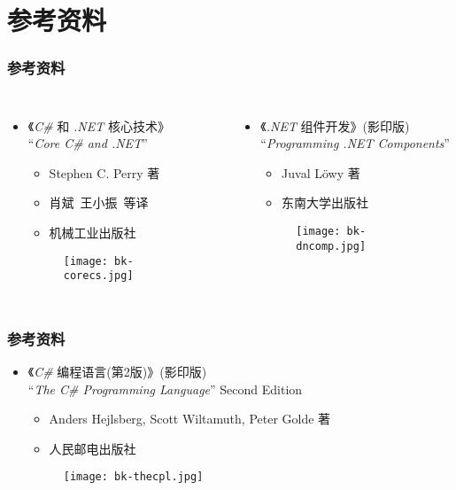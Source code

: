 \section{参考资料}
\begin{frame}[t]
\frametitle{参考资料}

\begin{columns}
  \begin{itemize}
  \item 《\textit{C\#} 和 \textit{.NET} 核心技术》\\
    ``\textit{Core C\# and .NET}''
    \begin{itemize}
    \item Stephen C. Perry 著
    \item 肖斌\ 王小振\ 等译
    \item 机械工业出版社
    \end{itemize}
    \begin{figure}
      \centering
\texttt{[image: bk-corecs.jpg]}
    \end{figure}
  \end{itemize}

  \begin{itemize}
  \item 《\textit{.NET} 组件开发》(影印版)\\
 ``\textit{Programming .NET Components}''
    \begin{itemize}
    \item Juval L\"owy 著
    \item 东南大学出版社
    \end{itemize}
    \begin{figure}
      \centering
\texttt{[image: bk-dncomp.jpg]}
    \end{figure}
  \end{itemize}
\end{columns}
\end{frame}

\begin{frame}[t]
\frametitle{参考资料}

\begin{itemize}
\item 《\textit{C\#} 编程语言(第2版)》(影印版)\\
  ``\textit{The C\# Programming Language}'' Second Edition
  \begin{itemize}
  \item Anders Hejlsberg, Scott Wiltamuth, Peter Golde 著
  \item 人民邮电出版社
  \end{itemize}
  \begin{figure}
    \centering
    \texttt{[image: bk-thecpl.jpg]}
  \end{figure}
\end{itemize}
\end{frame}

